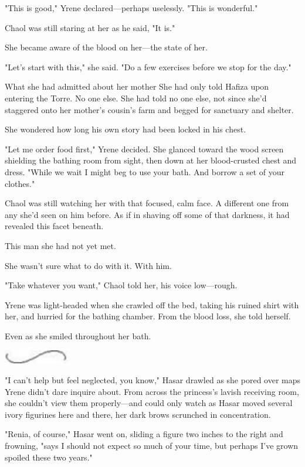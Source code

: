 "This is good," Yrene declared---perhaps uselessly. "This is wonderful."

Chaol was still staring at her as he said, "It is."

She became aware of the blood on her---the state of her.

"Let's start with this," she said. "Do a few exercises before we stop for the day."

What she had admitted about her mother  She had only told Hafiza upon entering the Torre. No one else. She had told no one else, not since she'd staggered onto her mother's cousin's farm and begged for sanctuary and shelter.

She wondered how long his own story had been locked in his chest.

"Let me order food first," Yrene decided. She glanced toward the wood screen shielding the bathing room from sight, then down at her blood-crusted chest and dress. "While we wait  I might beg to use your bath. And borrow a set of your clothes."

Chaol was still watching her with that focused, calm face. A different one from any she'd seen on him before. As if in shaving off some of that darkness, it had revealed this facet beneath.

This man she had not yet met.

She wasn't sure what to do with it. With him.

"Take whatever you want," Chaol told her, his voice low---rough.

Yrene was light-headed when she crawled off the bed, taking his ruined shirt with her, and hurried for the bathing chamber. From the blood loss, she told herself.

Even as she smiled throughout her bath.

\includegraphics[width=1.12in,height=0.24in]{images/seperator}

"I can't help but feel neglected, you know," Hasar drawled as she pored over maps Yrene didn't dare inquire about. From across the princess's lavish receiving room, she couldn't view them properly---and could only watch as Hasar moved several ivory figurines here and there, her dark brows scrunched in concentration.

"Renia, of course," Hasar went on, sliding a figure two inches to the right and frowning, "says I should not expect so much of your time, but perhaps I've grown spoiled these two years."

